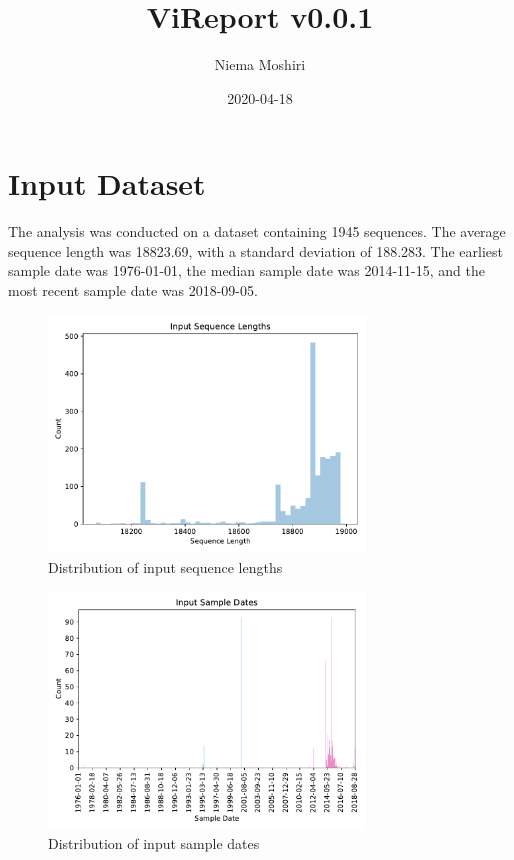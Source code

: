 \documentclass{article}
\title{\vspace{-2.0cm}ViReport v0.0.1}
\author{Niema Moshiri}
\date{2020-04-18}
\begin{document}
\maketitle

\section{Input Dataset}
The analysis was conducted on a dataset containing 1945 sequences. The average sequence length was 18823.69, with a standard deviation of 188.283. The earliest sample date was 1976-01-01, the median sample date was 2014-11-15, and the most recent sample date was 2018-09-05.

\begin{figure}[h]
\centering
\includegraphics[width=0.75\textwidth,keepaspectratio]{./figs/input_sequence_lengths.pdf}
\caption{Distribution of input sequence lengths}
\end{figure}



\begin{figure}[h]
\centering
\includegraphics[width=0.75\textwidth,keepaspectratio]{./figs/input_sample_dates.pdf}
\caption{Distribution of input sample dates}
\end{figure}
\end{document}
